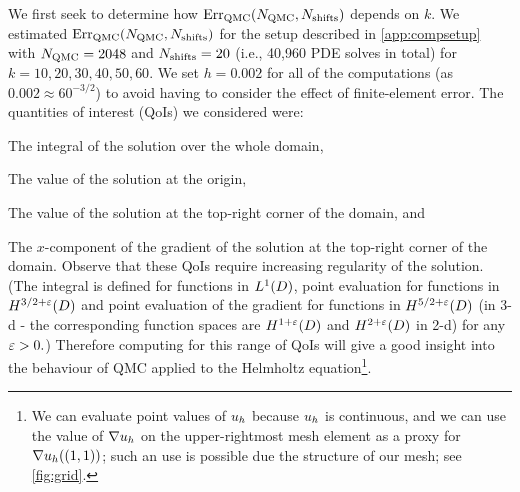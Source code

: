 We first seek to determine how $\QMCerror{\NQMC}{\Nshifts}$ depends on $k.$ We estimated $\QMCerror{\NQMC}{\Nshifts}$ for the setup described in \cref{app:compsetup} with $N_{\mathrm{QMC}} = 2048$ and $N_{\mathrm{shifts}}=20$ (i.e., 40,960 PDE solves in total) for $k = 10,20,30,40,50,60$. We set $h = 0.002$ for all of the computations (as $0.002 \approx 60^{-3/2}$) to avoid having to consider the effect of finite-element error. The quantities of interest (QoIs) we considered were:
\bit
\item The integral of the solution over the whole domain,
\item The value of the solution at the origin,
\item The value of the solution at the top-right corner of the domain, and
\item The $x$-component of the gradient of the solution at the top-right corner of the domain.
  \eit
  Observe that these QoIs require increasing regularity of the solution. (The integral is defined for functions in $\LoD$, point evaluation for functions in $\Hfn{}{3/2 + \eps}{D}$ and point evaluation of the gradient for functions in $\Hfn{}{5/2+\eps}{D}$ (in 3-d - the corresponding function spaces are $\Hfn{}{1+\eps}{D}$ and $\Hfn{}{2+\eps}{D}$ in 2-d) for any $\varepsilon > 0.$) Therefore computing for this range of QoIs will give a good insight into the behaviour of QMC applied to the Helmholtz equation\footnote{We can evaluate point values of $u_{h}$ because $u_{h}$ is continuous, and we can use the value of $\nabla u_{h}$ on the upper-rightmost mesh element as a proxy for $\nabla u_{h}((1,1))$; such an use is possible due the structure of our mesh; see \cref{fig:grid}.}.


